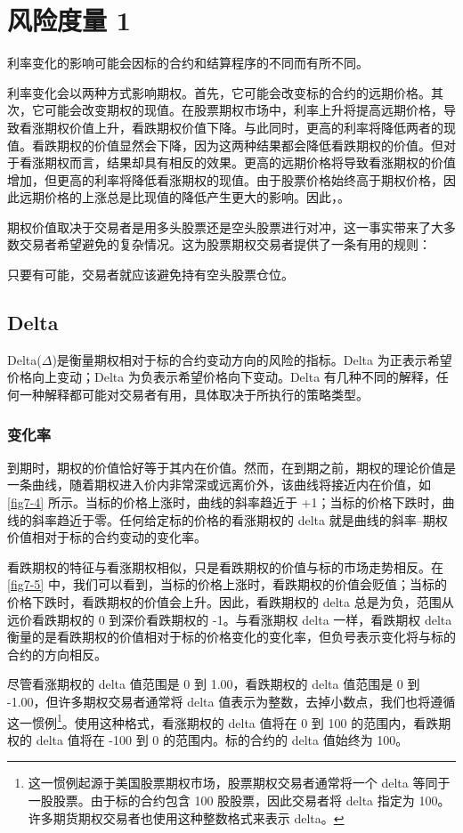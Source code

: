 \chapter{风险度量 1}
利率变化的影响可能会因标的合约和结算程序的不同而有所不同。

利率变化会以两种方式影响期权。首先，它可能会改变标的合约的远期价格。其次，它可能会改变期权的现值。在股票期权市场中，利率上升将提高远期价格，导致看涨期权价值上升，看跌期权价值下降。与此同时，更高的利率将降低两者的现值。看跌期权的价值显然会下降，因为这两种结果都会降低看跌期权的价值。但对于看涨期权而言，结果却具有相反的效果。更高的远期价格将导致看涨期权的价值增加，但更高的利率将降低看涨期权的现值。由于股票价格始终高于期权价格，因此远期价格的上涨总是比现值的降低产生更大的影响。因此，。

期权价值取决于交易者是用多头股票还是空头股票进行对冲，这一事实带来了大多数交易者希望避免的复杂情况。这为股票期权交易者提供了一条有用的规则：
\begin{tcolorbox}
    只要有可能，交易者就应该避免持有空头股票仓位。
\end{tcolorbox}
\section{Delta}
Delta($\Delta$)是衡量期权相对于标的合约变动方向的风险的指标。Delta 为正表示希望价格向上变动；Delta 为负表示希望价格向下变动。Delta 有几种不同的解释，任何一种解释都可能对交易者有用，具体取决于所执行的策略类型。
\subsection{变化率}
到期时，期权的价值恰好等于其内在价值。然而，在到期之前，期权的理论价值是一条曲线，随着期权进入价内非常深或远离价外，该曲线将接近内在价值，如 \autoref{fig7-4} 所示。当标的价格上涨时，曲线的斜率趋近于 +1；当标的价格下跌时，曲线的斜率趋近于零。任何给定标的价格的看涨期权的 delta 就是曲线的斜率--期权价值相对于标的合约变动的变化率。


看跌期权的特征与看涨期权相似，只是看跌期权的价值与标的市场走势相反。在 \autoref{fig7-5} 中，我们可以看到，当标的价格上涨时，看跌期权的价值会贬值；当标的价格下跌时，看跌期权的价值会上升。因此，看跌期权的 delta 总是为负，范围从远价看跌期权的 0 到深价看跌期权的 -1。与看涨期权 delta 一样，看跌期权 delta 衡量的是看跌期权的价值相对于标的价格变化的变化率，但负号表示变化将与标的合约的方向相反。


尽管看涨期权的 delta 值范围是 0 到 1.00，看跌期权的 delta 值范围是 0 到 -1.00，但许多期权交易者通常将 delta 值表示为整数，去掉小数点，我们也将遵循这一惯例\footnote{这一惯例起源于美国股票期权市场，股票期权交易者通常将一个 delta 等同于一股股票。由于标的合约包含 100 股股票，因此交易者将 delta 指定为 100。许多期货期权交易者也使用这种整数格式来表示 delta。}。使用这种格式，看涨期权的 delta 值将在 0 到 100 的范围内，看跌期权的 delta 值将在 -100 到 0 的范围内。标的合约的 delta 值始终为 100。